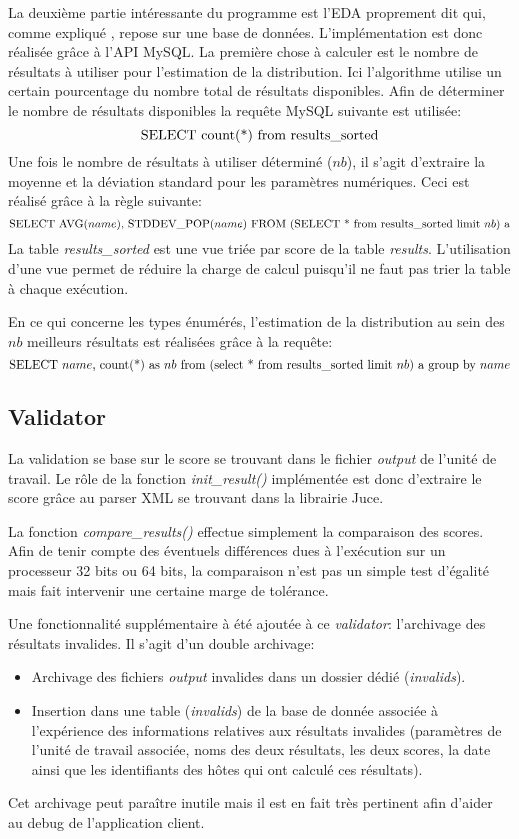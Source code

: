 \documentclass[a4paper, 11pt]{article}
\begin{document}
La deuxième partie intéressante du programme est l'EDA proprement dit qui, comme expliqué %
, repose sur une base de données. L'implémentation est donc réalisée grâce à l'API MySQL. La première chose à calculer est le nombre de résultats à utiliser pour l'estimation de la distribution. Ici l'algorithme utilise un certain pourcentage du nombre total de résultats disponibles. Afin de déterminer le nombre de résultats disponibles la requête MySQL suivante est utilisée:%
$$\textnormal{SELECT count(*) from results\_sorted}$$
Une fois le nombre de résultats à utiliser déterminé ($nb$), il s'agit d'extraire la moyenne et la déviation standard pour les paramètres numériques. Ceci est réalisé grâce à la règle suivante:
$$\textnormal{SELECT AVG(}name\textnormal{), STDDEV\_POP(}name\textnormal{) FROM (SELECT * from results\_sorted limit }nb\textnormal{) a}$$ %
La table \textit{results\_sorted} est une vue triée par score de la table \textit{results}. L'utilisation d'une vue permet de réduire la charge de calcul puisqu'il ne faut pas trier la table à chaque exécution.

En ce qui concerne les types énumérés, l'estimation de la distribution au sein des $nb$ meilleurs résultats est réalisées grâce à la requête:
$$\textnormal{SELECT }name\textnormal{, count(*) as }nb\textnormal{ from (select * from results\_sorted limit }nb\textnormal{) a group by }name$$

\subsection{Validator}
La validation se base sur le score se trouvant dans le fichier \textit{output} de l'unité de travail. Le rôle de la fonction \textit{init\_result()} implémentée est donc d'extraire le score grâce au parser XML se trouvant dans la librairie Juce.

La fonction \textit{compare\_results()} effectue simplement la comparaison des scores. Afin de tenir compte des éventuels différences dues à l'exécution sur un processeur 32 bits ou 64 bits, la comparaison n'est pas un simple test d'égalité mais fait intervenir une certaine marge de tolérance.

Une fonctionnalité supplémentaire à été ajoutée à ce \textit{validator}: l'archivage des résultats invalides. Il s'agit d'un double archivage:
\begin{itemize}
\item Archivage des fichiers \textit{output} invalides dans un dossier dédié (\textit{invalids}).
\item Insertion dans une table (\textit{invalids}) de la base de donnée associée à l'expérience des informations relatives aux résultats invalides (paramètres de l'unité de travail associée, noms des deux résultats, les deux scores, la date ainsi que les identifiants des hôtes qui ont calculé ces résultats).
\end{itemize}
Cet archivage peut paraître inutile mais il est en fait très pertinent afin d'aider au debug de l'application client.
\end{document}
